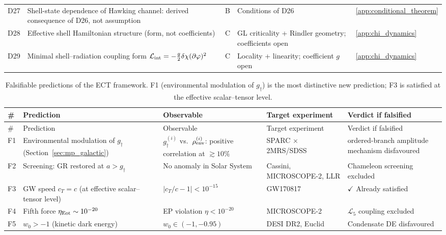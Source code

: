 \documentclass[11pt,a4paper]{article}
\numberwithin{equation}{section}
\begin{document}
\begin{longtable}{@{}p{}p{}p{}p{}p{}@{}}
D27 & Shell-state dependence of Hawking channel: derived consequence of D26, not assumption & B & Conditions of D26 & \ref{app:conditional_theorem} \\
D28 & Effective shell Hamiltonian structure (form, not coefficients) & C & GL criticality + Rindler geometry; coefficients open & \ref{app:chi_dynamics} \\
D29 & Minimal shell--radiation coupling form $\mathcal{L}_{\rm int}=-\tfrac{g}{2}\delta\chi(\partial\varphi)^2$ & C & Locality + linearity; coefficient $g$ open & \ref{app:chi_dynamics} \\
\bottomrule
\end{longtable}

\begin{longtable}{@{}p{}p{}p{}p{}p{}@{}}
\caption{Falsifiable predictions of the ECT framework. F1 (environmental modulation of $g_\dagger$) is the most distinctive new prediction; F3 is satisfied at the effective scalar--tensor level.}
\label{tab:ECT_predictions}\\

\toprule
\# & Prediction & Observable & Target experiment & Verdict if falsified \\
\midrule
\endfirsthead

\toprule
\# & Prediction & Observable & Target experiment & Verdict if falsified \\
\midrule
\endhead

F1 & Environmental modulation of $g_\dagger$
  (Section~\ref{sec:mp_galactic}) &
$g_\dagger^{(i)}$ vs.\ $\rho_{\rm env}^{(i)}$:
  positive correlation at $\gtrsim\!10\%$ &
SPARC $\times$ 2MRS/SDSS &
ordered-branch amplitude mechanism disfavoured \\



F2 & Screening: GR restored at $a > g_\dagger$ &
No anomaly in Solar System &
Cassini, MICROSCOPE-2, LLR &
Chameleon screening excluded \\

F3 & GW speed $c_T = c$ (at effective scalar--tensor level) &
$|c_T/c - 1| < 10^{-15}$ &
GW170817 &
$\checkmark$ Already satisfied \\

F4 & Fifth force $\eta_{\rm Eot}\sim10^{-20}$ &
EP violation $\eta<10^{-20}$ &
MICROSCOPE-2 \cite{MICROSCOPE2022} &
$\mathcal{L}_5$ coupling excluded \\

F5 & $w_0>-1$ (kinetic dark energy) &
$w_0\in(-1,-0.95)$ &
DESI DR2, Euclid &
Condensate DE disfavoured \\


\end{longtable}
\end{document}
